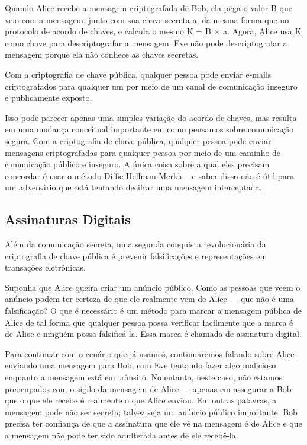 \documentclass{book}
\begin{document}
Quando Alice recebe a mensagem criptografada de Bob, ela pega o valor B que veio com a mensagem, junto com sua chave secreta a, da mesma forma que no protocolo de acordo de chaves, e calcula o mesmo K = B × a. Agora, Alice usa K como chave para descriptografar a mensagem. Eve não pode descriptografar a mensagem porque ela não conhece as chaves secretas.

Com a criptografia de chave pública, qualquer pessoa pode enviar e-mails criptografados para qualquer um por meio de um canal de comunicação inseguro e publicamente exposto.

Isso pode parecer apenas uma simples variação do acordo de chaves, mas resulta em uma mudança conceitual importante em como pensamos sobre comunicação segura. Com a criptografia de chave pública, qualquer pessoa pode enviar mensagens criptografadas para qualquer pessoa por meio de um caminho de comunicação público e inseguro. A única coisa sobre a qual eles precisam concordar é usar o método Diffie-Hellman-Merkle - e saber disso não é útil para um adversário que está tentando decifrar uma mensagem interceptada.


\subsection{Assinaturas Digitais}
\label{segredos:ass-digitais}

Além da comunicação secreta, uma segunda conquista revolucionária da criptografia de chave pública é prevenir falsificações e representações em transações eletrônicas.

Suponha que Alice queira criar um anúncio público. Como as pessoas que veem o anúncio podem ter certeza de que ele realmente vem de Alice --- que não é uma falsificação? O que é necessário é um método para marcar a mensagem pública de Alice de tal forma que qualquer pessoa possa verificar facilmente que a marca é de Alice e ninguém possa falsificá-la. Essa marca é chamada de assinatura digital.

Para continuar com o cenário que já usamos, continuaremos falando sobre Alice enviando uma mensagem para Bob, com Eve tentando fazer algo malicioso enquanto a mensagem está em trânsito. No entanto, neste caso, não estamos preocupados com o sigilo da mensagem de Alice --- apenas em assegurar a Bob que o que ele recebe é realmente o que Alice enviou. Em outras palavras, a mensagem pode não ser secreta; talvez seja um anúncio público importante. Bob precisa ter confiança de que a assinatura que ele vê na mensagem é de Alice e que a mensagem não pode ter sido adulterada antes de ele recebê-la.
\end{document}
